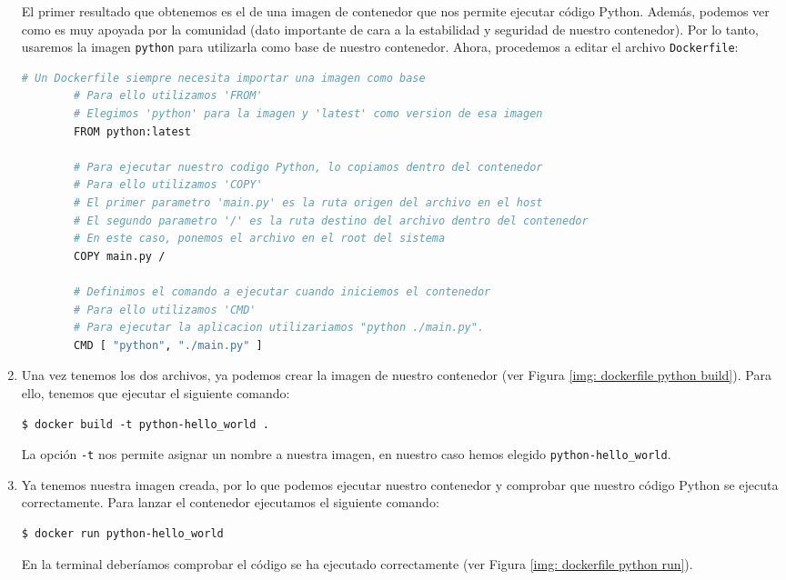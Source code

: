 \documentclass[a4paper, oneside, 12pt]{book}
\begin{document}
\begin{enumerate}
	\noindent El primer resultado que obtenemos es el de una imagen de contenedor que nos permite ejecutar código Python. Además, podemos ver como es muy apoyada por la comunidad (dato importante de cara a la estabilidad y seguridad de nuestro contenedor). Por lo tanto, usaremos la imagen \texttt{python} para utilizarla como base de nuestro contenedor. Ahora, procedemos a editar el archivo \texttt{Dockerfile}:
	\begin{lstlisting}[language=bash, caption={Contenido del archivo Dockerfile para crear contenedor con código Python}]
		# Un Dockerfile siempre necesita importar una imagen como base
		# Para ello utilizamos 'FROM'
		# Elegimos 'python' para la imagen y 'latest' como version de esa imagen
		FROM python:latest
		
		# Para ejecutar nuestro codigo Python, lo copiamos dentro del contenedor
		# Para ello utilizamos 'COPY'
		# El primer parametro 'main.py' es la ruta origen del archivo en el host
		# El segundo parametro '/' es la ruta destino del archivo dentro del contenedor
		# En este caso, ponemos el archivo en el root del sistema
		COPY main.py /
		
		# Definimos el comando a ejecutar cuando iniciemos el contenedor
		# Para ello utilizamos 'CMD'
		# Para ejecutar la aplicacion utilizariamos "python ./main.py".
		CMD [ "python", "./main.py" ]
	\end{lstlisting}
	
	\pagebreak
	
	\item Una vez tenemos los dos archivos, ya podemos crear la imagen de nuestro contenedor (ver Figura \ref{img: dockerfile python build}). Para ello, tenemos que ejecutar el siguiente comando:
	\begin{verbatim}
$ docker build -t python-hello_world .
	\end{verbatim}

	\noindent La opción \texttt{-t} nos permite asignar un nombre a nuestra imagen, en nuestro caso hemos elegido \texttt{python-hello\_world}.
	
	\item Ya tenemos nuestra imagen creada, por lo que podemos ejecutar nuestro contenedor y comprobar que nuestro código Python se ejecuta correctamente. Para lanzar el contenedor ejecutamos el siguiente comando:
	\begin{verbatim}
$ docker run python-hello_world
	\end{verbatim}

	\noindent En la terminal deberíamos comprobar el código se ha ejecutado correctamente (ver Figura \ref{img: dockerfile python run}).
	

\end{enumerate}
\end{document}
